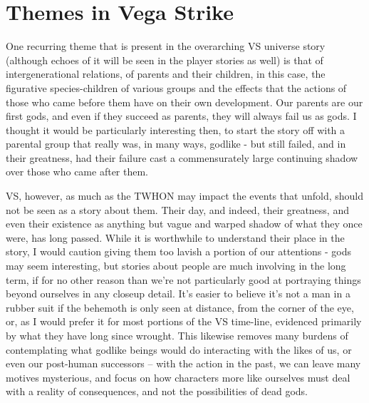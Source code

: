 \section{Themes in Vega Strike}
\label{sec:VSthemes}
One recurring theme that is present in the overarching VS universe
story (although echoes of it will be seen in the player stories as
well) is that of intergenerational relations, of parents and their
children, in this case, the figurative species-children of various
groups and the effects that the actions of those who came before them
have on their own development. Our parents are our first gods, and
even if they succeed as parents, they will always fail us as gods. I
thought it would be particularly interesting then, to start the story
off with a parental group that really was, in many ways, godlike - but
still failed, and in their greatness, had their failure cast a
commensurately large continuing shadow over those who came after them.

VS, however, as much as the TWHON may impact the events that unfold,
should not be seen as a story about them. Their day, and indeed, their
greatness, and even their existence as anything but vague and warped
shadow of what they once were, has long passed. While it is worthwhile
to understand their place in the story, I would caution giving them
too lavish a portion of our attentions - gods may seem interesting,
but stories about people are much involving in the long term, if for
no other reason than we're not particularly good at portraying things
beyond ourselves in any closeup detail. It's easier to believe it's
not a man in a rubber suit if the behemoth is only seen at distance,
from the corner of the eye, or, as I would prefer it for most portions
of the VS time-line, evidenced primarily by what they have long since
wrought. This likewise removes many burdens of contemplating what
godlike beings would do interacting with the likes of us, or even our
post-human successors -- with the action in the past, we can leave
many motives mysterious, and focus on how characters more like
ourselves must deal with a reality of consequences, and not the
possibilities of dead gods.




